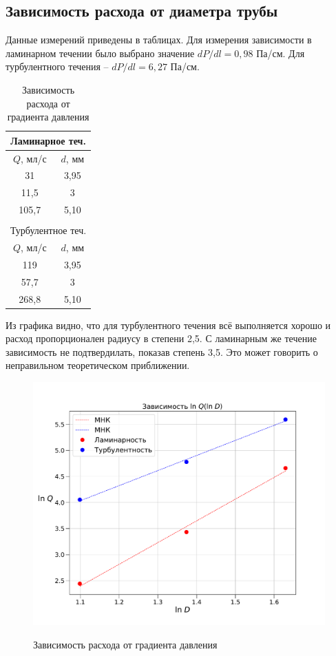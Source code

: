\documentclass[a4paper,12pt]{article} %
\begin{document}
\subsection{Зависимость расхода от диаметра трубы}

Данные измерений приведены в таблицах. Для измерения зависимости в ламинарном течении было выбрано значение $dP/dl = 0,98$ Па/см. Для турбулентного течения -- $dP/dl = 6,27$ Па/см.


\begin{table}[H]
    \centering
    \begin{tabular}{|c|c|}
    \hline \multicolumn{2}{|c|}{Ламинарное теч.} \\
        \hline $Q$, мл/с & $d$, мм \\ \hline
        31 & 3,95 \\ \hline
        11,5 & 3 \\ \hline
        105,7 &  5,10 \\ \hline
        \multicolumn{2}{c}{} \\ \hline
        \multicolumn{2}{|c|}{Турбулентное теч.} \\ \hline
        $Q$, мл/с & $d$, мм \\ \hline
        119 & 3,95 \\ \hline
        57,7 & 3 \\ \hline
        268,8 &  5,10 \\ \hline
    \end{tabular}
    \caption{Зависимость расхода от градиента давления}
\end{table}




Из графика видно, что для турбулентного течения всё выполняется хорошо и расход пропорционален радиусу в степени 2,5. С ламинарным же течение зависимость не подтвердилать, показав степень 3,5. Это может говорить о неправильном теоретическом приближении.

\begin{figure}[H]
    \centering
    \includegraphics[scale=0.65]{q(d).pdf}
    \label{q(d)}
    \caption{Зависимость расхода от градиента давления}
\end{figure}
\end{document}
